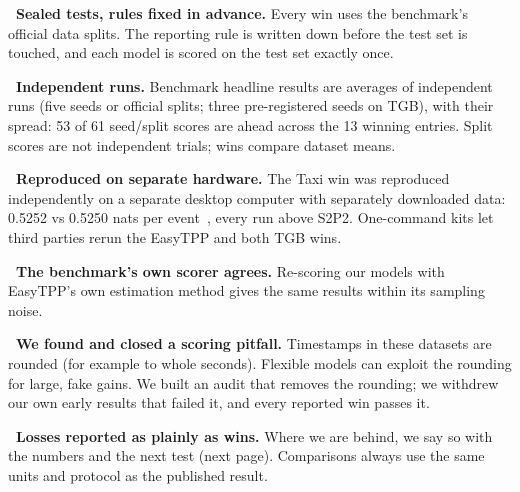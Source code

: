 \documentclass[10pt, a4 paper]{article}
\newcommand{\sect}[2]{\vspace{2pt}{\color{ours}\footnotesize\bfseries\MakeUppercase{#1}}\par\vspace{-3pt}{\LARGE\bfseries #2}\par\vspace{2pt}}
\newcommand{\up}{\,{\color{good}\faArrowUp}}
\begin{document}
\begin{minipage}[t]{.485\linewidth}
\begin{tile}[height=31mm]
\textbf{\faLock\ Sealed tests, rules fixed in advance.} Every win uses the benchmark's official data splits. The reporting rule is written down before the test set is touched, and each model is scored on the test set exactly once.
\end{tile}
\begin{tile}[height=31mm]
\textbf{\faRedo\ Independent runs.} Benchmark headline results are averages of independent runs (five seeds or official splits; three pre-registered seeds on TGB), with their spread: 53 of 61 seed/split scores are ahead across the 13 winning entries. Split scores are not independent trials; wins compare dataset means.
\end{tile}
\begin{tile}[height=31mm]
\textbf{\faServer\ Reproduced on separate hardware.} The Taxi win was reproduced independently on a separate desktop computer with separately downloaded data: 0.5252 vs 0.5250 nats per event \up, every run above S2P2. One-command kits let third parties rerun the EasyTPP and both TGB wins.
\end{tile}
\end{minipage}\hfill
\begin{minipage}[t]{.485\linewidth}
\begin{tile}[height=31mm]
\textbf{\faCheckDouble\ The benchmark's own scorer agrees.} Re-scoring our models with EasyTPP's own estimation method gives the same results within its sampling noise.
\end{tile}
\begin{tile}[height=31mm]
\textbf{\faSearch\ We found and closed a scoring pitfall.} Timestamps in these datasets are rounded (for example to whole seconds). Flexible models can exploit the rounding for large, fake gains. We built an audit that removes the rounding; we withdrew our own early results that failed it, and every reported win passes it.
\end{tile}
\begin{tile}[height=31mm]
\textbf{\faBalanceScale\ Losses reported as plainly as wins.} Where we are behind, we say so with the numbers and the next test (next page). Comparisons always use the same units and protocol as the published result.
\end{tile}
\end{minipage}

\newpage
\sect{Learning more economically}{Teaching the model how to learn}
\end{document}
